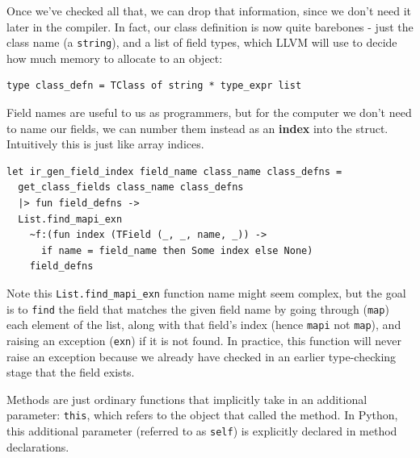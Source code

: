 Once we've checked all that, we can drop that information, since we
don't need it later in the compiler. In fact, our class definition is
now quite barebones - just the class name (a \texttt{string}), and a
list of field types, which LLVM will use to decide how much memory to
allocate to an object:

%

\begin{lstlisting}[caption={{frontend\_ir.mli}},language=caml]
type class_defn = TClass of string * type_expr list
\end{lstlisting}

Field names are useful to us as programmers, but for the computer we
don't need to name our fields, we can number them instead as an
\textbf{index} into the struct. Intuitively this is just like array
indices.

%

\begin{lstlisting}[caption={{ir\_gen\_env.ml}},language=caml]
let ir_gen_field_index field_name class_name class_defns =
  get_class_fields class_name class_defns
  |> fun field_defns ->
  List.find_mapi_exn
    ~f:(fun index (TField (_, _, name, _)) ->
      if name = field_name then Some index else None)
    field_defns
\end{lstlisting}

%

Note this \texttt{List.find\_mapi\_exn} function name might seem
complex, but the goal is to \texttt{find} the field that matches the
given field name by going through (\texttt{map}) each element of the
list, along with that field's index (hence \texttt{mapi} not
\texttt{map}), and raising an exception (\texttt{exn}) if it is not
found. In practice, this function will never raise an exception because
we already have checked in an earlier type-checking stage that the field
exists.

Methods are just ordinary functions that implicitly take in an
additional parameter: \texttt{this}, which refers to the object that
called the method. In Python, this additional parameter (referred to as
\texttt{self}) is explicitly declared in method declarations.

